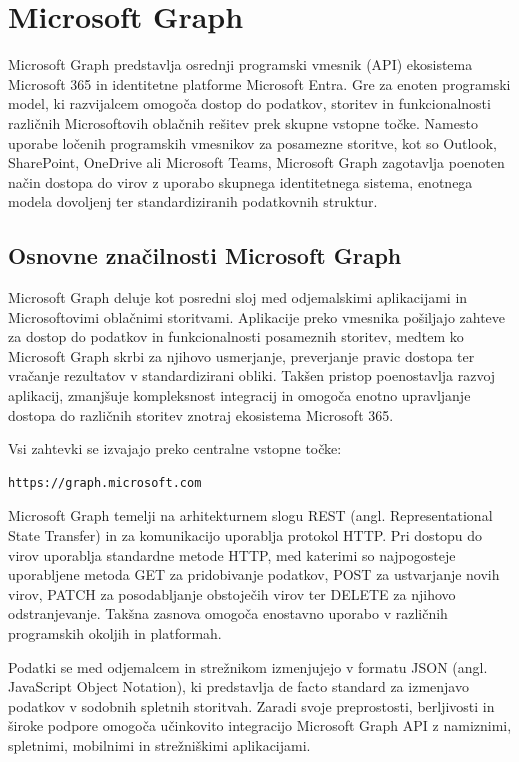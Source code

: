 \documentclass[a4paper, 12pt]{book}
\begin{document}
\chapter{Microsoft Graph}

Microsoft Graph predstavlja osrednji programski vmesnik (API) ekosistema Microsoft 365 in identitetne platforme Microsoft Entra.
Gre za enoten programski model, ki razvijalcem omogoča dostop do podatkov, storitev in funkcionalnosti različnih Microsoftovih oblačnih rešitev prek skupne vstopne točke.
Namesto uporabe ločenih programskih vmesnikov za posamezne storitve, kot so Outlook, SharePoint, OneDrive ali Microsoft Teams, Microsoft Graph zagotavlja poenoten način dostopa do virov z uporabo skupnega identitetnega sistema, enotnega modela dovoljenj ter standardiziranih podatkovnih struktur.

\section{Osnovne značilnosti Microsoft Graph}

Microsoft Graph deluje kot posredni sloj med odjemalskimi aplikacijami in Microsoftovimi oblačnimi storitvami.
Aplikacije preko vmesnika pošiljajo zahteve za dostop do podatkov in funkcionalnosti posameznih storitev, medtem ko Microsoft Graph skrbi za njihovo usmerjanje, preverjanje pravic dostopa ter vračanje rezultatov v standardizirani obliki.
Takšen pristop poenostavlja razvoj aplikacij, zmanjšuje kompleksnost integracij in omogoča enotno upravljanje dostopa do različnih storitev znotraj ekosistema Microsoft 365.

Vsi zahtevki se izvajajo preko centralne vstopne točke:

\begin{verbatim}
https://graph.microsoft.com
\end{verbatim}

Microsoft Graph temelji na arhitekturnem slogu REST (angl. Representational State Transfer) in za komunikacijo uporablja protokol HTTP.
Pri dostopu do virov uporablja standardne metode HTTP, med katerimi so najpogosteje uporabljene metoda GET za pridobivanje podatkov, POST za ustvarjanje novih virov, PATCH za posodabljanje obstoječih virov ter DELETE za njihovo odstranjevanje.
Takšna zasnova omogoča enostavno uporabo v različnih programskih okoljih in platformah.

Podatki se med odjemalcem in strežnikom izmenjujejo v formatu JSON (angl. JavaScript Object Notation), ki predstavlja de facto standard za izmenjavo podatkov v sodobnih spletnih storitvah.
Zaradi svoje preprostosti, berljivosti in široke podpore omogoča učinkovito integracijo Microsoft Graph API z namiznimi, spletnimi, mobilnimi in strežniškimi aplikacijami.
\end{document}
